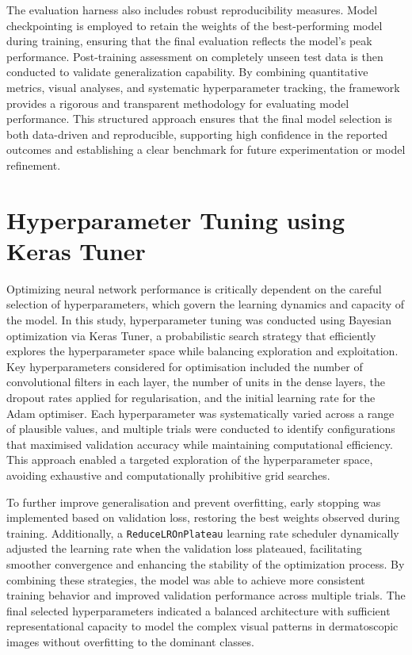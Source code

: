 \documentclass[conference]{IEEEtran}
\begin{document}
The evaluation harness also includes robust reproducibility measures. Model checkpointing is employed to retain the weights of the best-performing model during training, ensuring that the final evaluation reflects the model’s peak performance. Post-training assessment on completely unseen test data is then conducted to validate generalization capability. By combining quantitative metrics, visual analyses, and systematic hyperparameter tracking, the framework provides a rigorous and transparent methodology for evaluating model performance. This structured approach ensures that the final model selection is both data-driven and reproducible, supporting high confidence in the reported outcomes and establishing a clear benchmark for future experimentation or model refinement.
	
	\section{Hyperparameter Tuning using Keras Tuner}
	
Optimizing neural network performance is critically dependent on the careful selection of hyperparameters, which govern the learning dynamics and capacity of the model. In this study, hyperparameter tuning was conducted using Bayesian optimization via Keras Tuner, a probabilistic search strategy that efficiently explores the hyperparameter space while balancing exploration and exploitation\cite{b1}. Key hyperparameters considered for optimisation included the number of convolutional filters in each layer, the number of units in the dense layers, the dropout rates applied for regularisation, and the initial learning rate for the Adam optimiser. Each hyperparameter was systematically varied across a range of plausible values, and multiple trials were conducted to identify configurations that maximised validation accuracy while maintaining computational efficiency. This approach enabled a targeted exploration of the hyperparameter space, avoiding exhaustive and computationally prohibitive grid searches.

To further improve generalisation and prevent overfitting, early stopping was implemented based on validation loss, restoring the best weights observed during training. Additionally, a \texttt{ReduceLROnPlateau} learning rate scheduler dynamically adjusted the learning rate when the validation loss plateaued, facilitating smoother convergence and enhancing the stability of the optimization process. By combining these strategies, the model was able to achieve more consistent training behavior and improved validation performance across multiple trials. The final selected hyperparameters indicated a balanced architecture with sufficient representational capacity to model the complex visual patterns in dermatoscopic images without overfitting to the dominant classes.
\end{document}
